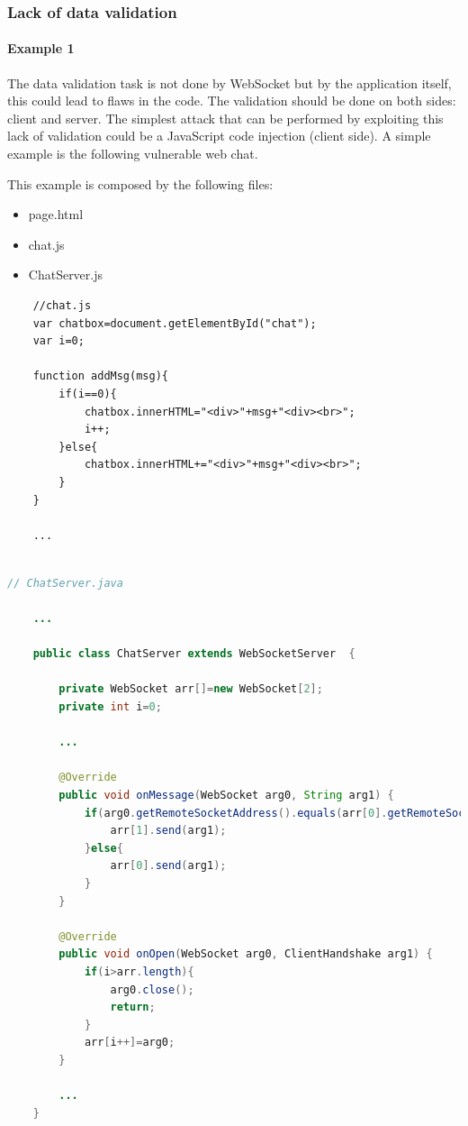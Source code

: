 	\subsubsection{Lack of data validation}
	
	\paragraph{Example 1} The data validation task is not done by WebSocket but by the application itself, this could lead to flaws in the code.\newline
	The validation should be done on both sides: client and server.\newline
	The simplest attack that can be performed by exploiting this lack of validation could be a JavaScript code injection (client side).\newline
	A simple example is the following vulnerable web chat.\newline
	
	This example is composed by the following files:
	\begin{itemize}
		\item page.html
		\item chat.js
		\item ChatServer.js
	\end{itemize}

	\begin{lstlisting}
	//chat.js
	var chatbox=document.getElementById("chat");
	var i=0;
	
	function addMsg(msg){
		if(i==0){
			chatbox.innerHTML="<div>"+msg+"<div><br>";
			i++;
		}else{
			chatbox.innerHTML+="<div>"+msg+"<div><br>";
		}
	}
	
	...
	
	\end{lstlisting}
	
	\begin{lstlisting}[language=Java]
	// ChatServer.java
	
	...
	
	public class ChatServer extends WebSocketServer  {
	
		private WebSocket arr[]=new WebSocket[2];
		private int i=0;
		
		...
		
		@Override
		public void onMessage(WebSocket arg0, String arg1) {
			if(arg0.getRemoteSocketAddress().equals(arr[0].getRemoteSocketAddress())){
				arr[1].send(arg1);
			}else{
				arr[0].send(arg1);
			}
		}
		
		@Override
		public void onOpen(WebSocket arg0, ClientHandshake arg1) {
			if(i>arr.length){
				arg0.close();
				return;
			}
			arr[i++]=arg0;
		}
		
		...
	}
	
	\end{lstlisting}
	
